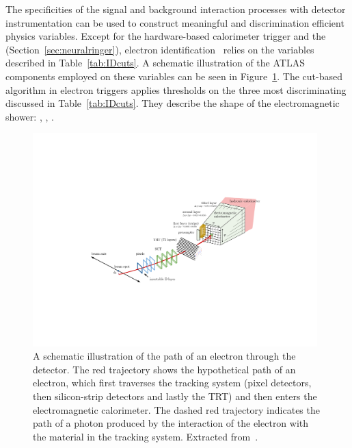 The specificities of the signal and background interaction processes with
detector instrumentation can be used to construct meaningful and discrimination
efficient physics variables. Except for the hardware-based calorimeter trigger
and the \rnn (Section~\ref{sec:neuralringer}), electron
identification~\cite{atlas_electron_id_offline} relies on the variables
described in Table~\ref{tab:IDcuts}. A schematic illustration of the ATLAS
components employed on these variables can be seen in
Figure~\ref{fig:schematic_id_inputs}. The cut-based algorithm in electron
triggers applies thresholds on the three most discriminating discussed in Table~\ref{tab:IDcuts}. They describe the shape of the electromagnetic shower: \reta{}, \eratio{}, \rhadone{}.




\begin{figure}[t]
  \begin{center}
  \includegraphics[width=0.98\textwidth]{sections/context/figures/electron_variables_3rdLayerGranularity_v2_noPhantom_noVars}
  \caption{
  A schematic illustration of the path of an electron through the detector.
  The red trajectory shows the hypothetical path of an electron, which first traverses
  the tracking system (pixel detectors, then silicon-strip detectors and lastly the TRT)
  and then enters the electromagnetic calorimeter.
  The dashed red trajectory indicates the path of a photon produced by the interaction of
  the electron with the material in the tracking system.
  Extracted from~\cite{aaboud2019electron}.
  }%
  \label{fig:schematic_id_inputs}
  \end{center}
\end{figure}
  




